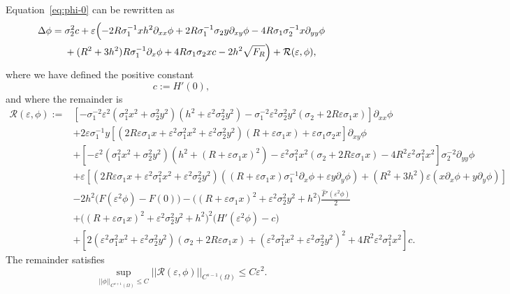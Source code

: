 \documentclass[12pt,reqno]{amsart}
\numberwithin{equation}{section}
\theoremstyle{definition}
\theoremstyle{remark}
\begin{document}
 Equation~\eqref{eq:phi-0} can be rewritten  as
\begin{equation}\label{eq:phi}
\begin{split}
\Delta\phi={}&\sigma_2^2c+\varepsilon\Bigl(-2R\sigma_1^{-1}xh^2\partial_{xx}\phi+2  R\sigma_1^{-1}\sigma_2y\partial_{xy}\phi-4R\sigma_1\sigma_2^{-1}x\partial_{yy}\phi\\
&
+(R^2+3h^2)R\sigma_1^{-1}\partial_x\phi 
+4R \sigma_1\sigma_2xc-2h^2\sqrt{F_R}\Bigr)
+\mathcal{R}(\varepsilon,\phi),
\end{split}
\end{equation}
where we have defined the positive constant 
$$c:=H'(0),$$
and where the remainder is
\begin{equation}\label{eq:R-structural}
\begin{split}
\mathcal{R}(\varepsilon,\phi):=&\left [-\sigma_1^{-2}\varepsilon^2(\sigma_1^2x^2+\sigma_2^2y^2)(h^2+\varepsilon^2\sigma_2^2y^2)-\sigma_1^{-2}\varepsilon^2\sigma_2^2y^2(\sigma_2+2R\varepsilon\sigma_1x)\right ]\partial_{xx}\phi \\
&+2\varepsilon\sigma_1^{-1}y\left[ (2R\varepsilon\sigma_1x+\varepsilon^2\sigma_1^2x^2+\varepsilon^2\sigma_2^2y^2)(R+\varepsilon\sigma_1x)+\varepsilon\sigma_1\sigma_2x\right] \partial_{xy}\phi  \\
&+\left [-\varepsilon^2(\sigma_1^2x^2+\sigma_2^2y^2)\left(h^2+(R+\varepsilon\sigma_1x)^2\right)-\varepsilon^2\sigma_1^2x^2(\sigma_2+2R\varepsilon\sigma_1x)-4R^2\varepsilon^2\sigma_1^{2}x^2\right ]\sigma_2^{-2}\partial_{yy}\phi \\
&+\varepsilon\left[ (2R\varepsilon\sigma_1x+\varepsilon^2\sigma_1^2x^2+\varepsilon^2\sigma_2^2y^2)
\left ((R+\varepsilon\sigma_1x)\sigma_1^{-1}\partial_x\phi+\varepsilon y\partial_y\phi\right )+(R^2+3h^2)\varepsilon(x\partial_x\phi+y\partial_y\phi)\right]  \\
&-2h^2\bigl(F(\varepsilon^2\phi)-F(0)\bigr)
-\bigl((R+\varepsilon\sigma_1x)^2+\varepsilon^2\sigma_2^2y^2+h^2\bigr) \frac{\widehat{F}'(\varepsilon^2\phi)}{2}  \\
&+\bigl((R+\varepsilon\sigma_1x)^2+\varepsilon^2\sigma_2^2y^2+h^2\bigr)^2\bigl(H'(\varepsilon^2\phi)-c\bigr)\\
&+\left [2(\varepsilon^2\sigma_1^2x^2+\varepsilon^2\sigma_2^2y^2)(\sigma_2+2R\varepsilon\sigma_1x)+(\varepsilon^2\sigma_1^2x^2+\varepsilon^2\sigma_2^2y^2)^2+4R^2\varepsilon^2\sigma_1^2x^2\right ]c.
\end{split}
\end{equation}
The remainder satisfies
\begin{equation*}%
\sup_{||\phi||_{C^{s+1}(\Omega)}\le C}
||\mathcal{R}(\varepsilon,\phi)||_{C^{s-1}(\Omega)}\le C\varepsilon^2.
\end{equation*}
\end{document}
